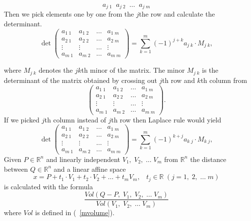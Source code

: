 \documentclass[color=black,11pt]{elegantpaper}
\begin{document}
$$
                 a_{j\; 1} \;\; a_{j\; 2} \;\; \dots \;\; a_{j\; m}
$$
Then we pick elements one by one from the $j$the row and calculate the determinant. 
$$
\det \left(\begin{array}{cccc}
                 a_{1\; 1} & a_{1\; 2} & \dots & a_{1\; m}\\
                 a_{2\; 1} & a_{2\; 2} & \dots & a_{2\; m}\\
                   \vdots & \vdots & \dots &\vdots \\
                 a_{m\; 1} & a_{m\; 2} & \dots & a_{m\; m}
           \end{array}  \right)= \sum_{k=1}^m (-1)^{j+k} a_{j\; k} \cdot M_{j\; k},
$$

where $M_{j\; k}$ denotes the $jk$th minor of the matrix. The minor  $M_{j\; k}$ is the determinant of the matrix obtained by crossing out $j$th row and $k$th column from 
$$
\left(\begin{array}{cccc}
                 a_{1\; 1} & a_{1\; 2} & \dots & a_{1\; m}\\
                 a_{2\; 1} & a_{2\; 2} & \dots & a_{2\; m}\\
                   \vdots & \vdots & \dots &\vdots \\
                 a_{m\; 1} & a_{m\; 2} & \dots & a_{m\; m}  
           \end{array}  \right).
$$
If we picked $j$th column instead of $j$th row then Laplace rule would yield
$$
\det \left(\begin{array}{cccc}
                 a_{1\; 1} & a_{1\; 2} & \dots & a_{1\; m}\\
                 a_{2\; 1} & a_{2\; 2} & \dots & a_{2\; m}\\
                   \vdots & \vdots & \dots &\vdots \\
                 a_{m\; 1} & a_{m\; 2} & \dots & a_{m\; m}
           \end{array}  \right)= \sum_{k=1}^m (-1)^{k+j} a_{k\; j} \cdot M_{k\; j},
$$
Given $P\in\mathbb{R}^n$ and linearly independent $V_1,\;V_2,\; \dots \; V_m$ from $\mathbb{R}^n$ the distance between $Q\in \mathbb{R}^n$ and a linear affine space
$$
x= P + t_1 \cdot V_1+t_2 \cdot V_2 + \dots + t_m V_m,\;\;\; t_j \in \mathbb{R}\;(j=1,\;2,\; \dots \; m)
$$
 is calculated with the formula
$$
\frac{Vol(Q-P,\;V_1,\;V_2,\;\dots \; V_m)}{Vol(V_1,\;V_2,\;\dots \; V_m)}
$$ 
where $Vol$ is defined in (~\ref{mvolume}).
\end{document}
